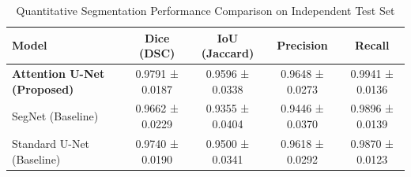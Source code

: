 \begin{table}[htbp]
\centering
\caption{Quantitative Segmentation Performance Comparison on Independent Test Set}
\label{tab:model_comparison}
\begin{tabular}{lcccc}
\hline
\textbf{Model} & \textbf{Dice (DSC)} & \textbf{IoU (Jaccard)} & \textbf{Precision} & \textbf{Recall} \\
\hline
\textbf{Attention U-Net (Proposed)} & 0.9791 ± 0.0187 & 0.9596 ± 0.0338 & 0.9648 ± 0.0273 & 0.9941 ± 0.0136 \\
SegNet (Baseline) & 0.9662 ± 0.0229 & 0.9355 ± 0.0404 & 0.9446 ± 0.0370 & 0.9896 ± 0.0139 \\
Standard U-Net (Baseline) & 0.9740 ± 0.0190 & 0.9500 ± 0.0341 & 0.9618 ± 0.0292 & 0.9870 ± 0.0123 \\
\hline
\end{tabular}
\end{table}
